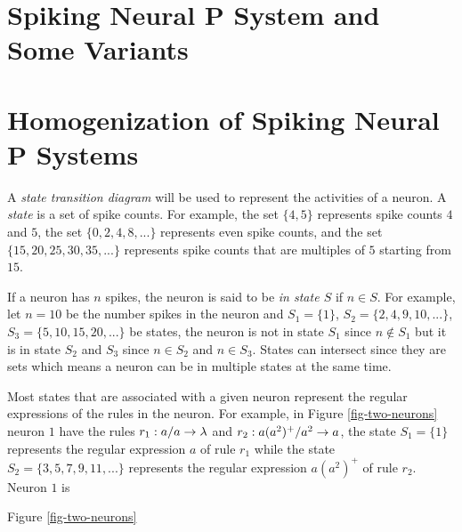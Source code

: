 \documentclass[runningheads,a4paper]{llncs}
\begin{document}
\section{Spiking Neural P System and Some Variants} \label{sec-snps}



\section{Homogenization of Spiking Neural P Systems} \label{sec-homo}

A \emph{state transition diagram} will be used to represent the activities of a neuron. 
A \emph{state} is a set of spike counts. For example, the set $\{4,5\}$ represents spike counts 
$4$ and $5$, the set $\{0,2,4,8,...\}$ represents even spike counts, and the set 
$\{15,20,25,30,35,...\}$ represents spike counts that are multiples of $5$ starting from $15$. 

If a neuron has $n$ spikes, the neuron is said to be \emph{in state $S$} if $n \in S$. For example, 
let $n=10$ be the number spikes in the neuron and $S_1=\{1\}$, $S_2=\{2,4,9,10,...\}$, 
$S_3=\{5,10,15,20,...\}$ be states, the neuron is not in state $S_1$ since $n \notin S_1$ but it is
in state $S_2$ and $S_3$ since $n \in S_2$ and $n \in S_3$. States can intersect since they are 
sets which means a neuron can be in multiple states at the same time. 

Most states that are associated with a given neuron represent the regular expressions of the rules
in the neuron. For example, in Figure \ref{fig-two-neurons} neuron $1$ have the rules $r_1: a/a \rightarrow \lambda$ and  
$r_2: a(a^2)^+/a^2 \rightarrow a$, the state $S_1=\{1\}$ represents the regular expression $a$ of rule $r_1$ 
while the state $S_2=\{3,5,7,9,11,...\}$ represents the regular expression $a(a^2)^+$ of rule $r_2$.
Neuron $1$ is  
 
                                                                                                
Figure \ref{fig-two-neurons}
\end{document}
